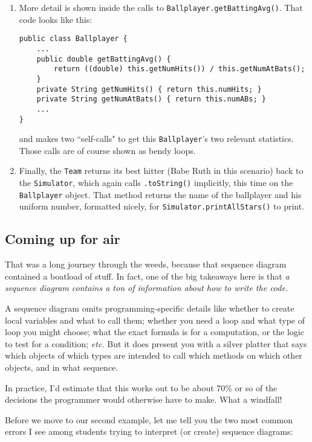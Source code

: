 \begin{enumerate}
\item More detail is shown inside the calls to
\texttt{Ballplayer.getBattingAvg()}. That code looks like this:

\begin{Verbatim}[fontsize=\scriptsize,samepage=true,frame=single]
public class Ballplayer {
    ...
    public double getBattingAvg() {
        return ((double) this.getNumHits()) / this.getNumAtBats();
    }
    private String getNumHits() { return this.numHits; }
    private String getNumAtBats() { return this.numABs; }
    ...
}
\end{Verbatim}

and makes two ``self-calls" to get this \texttt{Ballplayer}'s two relevant
statistics. Those calls are of course shown as bendy loops.

\item Finally, the \texttt{Team} returns its best hitter (Babe Ruth in this
scenario) back to the \texttt{Simulator}, which again calls
\texttt{.toString()} implicitly, this time on the \texttt{Ballplayer} object.
That method returns the name of the ballplayer and his uniform number,
formatted nicely, for \texttt{Simulator.printAllStars()} to print.

\end{enumerate}

\subsection{Coming up for air}

That was a long journey through the weeds, because that sequence diagram
contained a boatload of stuff. In fact, one of the big takeaways here is that
\textit{a sequence diagram contains a ton of information about how to write
the code.}

A sequence diagram omits programming-specific details like whether to create
local variables and what to call them; whether you need a loop and what type
of loop you might choose; what the exact formula is for a computation, or the
logic to test for a condition; \textit{etc.} But it does present you with a
silver platter that says which objects of which types are intended to call
which methods on which other objects, and in what sequence.

In practice, I'd estimate that this works out to be about 70\% or so of the
decisions the programmer would otherwise have to make. What a windfall!

Before we move to our second example, let me tell you the two most common
errors I see among students trying to interpret (or create) sequence diagrams:

